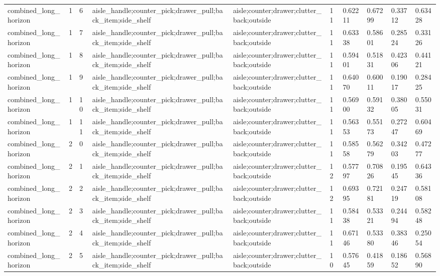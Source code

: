 \documentclass{article}
\begin{document}
\begin{table}[tbp]
{\begin{tabular}{llllllllll}
combined\_long\_horizon & 1 & 6 & aisle\_handle;counter\_pick;drawer\_pull;back\_item;side\_shelf & aisle;counter;drawer;clutter\_back;outside & 11 & 0.62211 & 0.67299 & 0.33712 & 0.63428 \\
combined\_long\_horizon & 1 & 7 & aisle\_handle;counter\_pick;drawer\_pull;back\_item;side\_shelf & aisle;counter;drawer;clutter\_back;outside & 11 & 0.63338 & 0.58601 & 0.28524 & 0.33126 \\
combined\_long\_horizon & 1 & 8 & aisle\_handle;counter\_pick;drawer\_pull;back\_item;side\_shelf & aisle;counter;drawer;clutter\_back;outside & 11 & 0.59401 & 0.51831 & 0.42306 & 0.44121 \\
combined\_long\_horizon & 1 & 9 & aisle\_handle;counter\_pick;drawer\_pull;back\_item;side\_shelf & aisle;counter;drawer;clutter\_back;outside & 11 & 0.64070 & 0.60011 & 0.19017 & 0.28425 \\
combined\_long\_horizon & 1 & 10 & aisle\_handle;counter\_pick;drawer\_pull;back\_item;side\_shelf & aisle;counter;drawer;clutter\_back;outside & 11 & 0.56900 & 0.59132 & 0.38005 & 0.55031 \\
combined\_long\_horizon & 1 & 11 & aisle\_handle;counter\_pick;drawer\_pull;back\_item;side\_shelf & aisle;counter;drawer;clutter\_back;outside & 11 & 0.56353 & 0.55173 & 0.27247 & 0.60469 \\
combined\_long\_horizon & 2 & 0 & aisle\_handle;counter\_pick;drawer\_pull;back\_item;side\_shelf & aisle;counter;drawer;clutter\_back;outside & 11 & 0.58558 & 0.56279 & 0.34203 & 0.47277 \\
combined\_long\_horizon & 2 & 1 & aisle\_handle;counter\_pick;drawer\_pull;back\_item;side\_shelf & aisle;counter;drawer;clutter\_back;outside & 12 & 0.57797 & 0.70826 & 0.19545 & 0.64336 \\
combined\_long\_horizon & 2 & 2 & aisle\_handle;counter\_pick;drawer\_pull;back\_item;side\_shelf & aisle;counter;drawer;clutter\_back;outside & 12 & 0.69395 & 0.72181 & 0.24719 & 0.58108 \\
combined\_long\_horizon & 2 & 3 & aisle\_handle;counter\_pick;drawer\_pull;back\_item;side\_shelf & aisle;counter;drawer;clutter\_back;outside & 11 & 0.58438 & 0.53321 & 0.24494 & 0.58248 \\
combined\_long\_horizon & 2 & 4 & aisle\_handle;counter\_pick;drawer\_pull;back\_item;side\_shelf & aisle;counter;drawer;clutter\_back;outside & 11 & 0.67146 & 0.53380 & 0.38346 & 0.25054 \\
combined\_long\_horizon & 2 & 5 & aisle\_handle;counter\_pick;drawer\_pull;back\_item;side\_shelf & aisle;counter;drawer;clutter\_back;outside & 10 & 0.57645 & 0.41859 & 0.18652 & 0.56890 \\
\bottomrule
\end{tabular}
}
\end{table}
\end{document}
